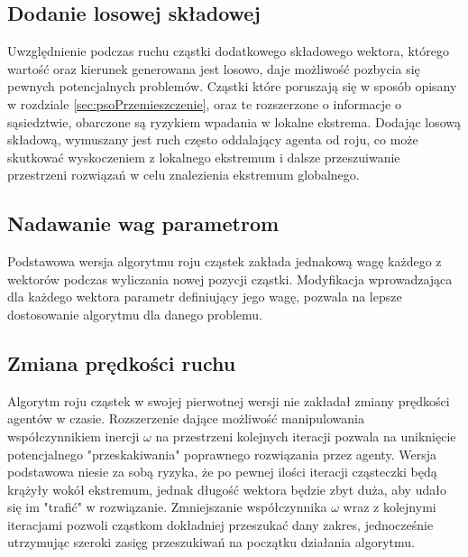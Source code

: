 \subsection{Dodanie losowej składowej}
\label{sec:psoLosowa}
Uwzględnienie podczas ruchu cząstki dodatkowego składowego wektora, którego wartość oraz kierunek generowana jest losowo, daje możliwość pozbycia się pewnych potencjalnych problemów. Cząstki które poruszają się w sposób opisany w rozdziale \ref{sec:psoPrzemieszczenie}, oraz te rozszerzone o informacje o sąsiedztwie, obarczone są ryzykiem wpadania w lokalne ekstrema. Dodając losową składową, wymuszany jest ruch często oddalający agenta od roju, co może skutkować wyskoczeniem z lokalnego ekstremum i dalsze przeszuiwanie przestrzeni rozwiązań w celu znalezienia ekstremum globalnego.


\subsection{Nadawanie wag parametrom}
\label{sec:psoWagi}
Podstawowa wersja algorytmu roju cząstek zakłada jednakową wagę każdego z wektorów podczas wyliczania nowej pozycji cząstki. Modyfikacja wprowadzająca dla każdego wektora parametr definiujący jego wagę, pozwala na lepsze dostosowanie algorytmu dla danego problemu.


\subsection{Zmiana prędkości ruchu}
\label{sec:psoPredkosc}
Algorytm roju cząstek w swojej pierwotnej wersji nie zakładał zmiany prędkości agentów w czasie. Rozszerzenie dające możliwość manipulowania współczynnikiem inercji $\omega$ na przestrzeni kolejnych iteracji pozwala na uniknięcie potencjalnego "przeskakiwania" poprawnego rozwiązania przez agenty. Wersja podstawowa niesie za sobą ryzyka, że po pewnej ilości iteracji cząsteczki będą krążyły wokół ekstremum, jednak długość wektora będzie zbyt duża, aby udało się im "trafić" w rozwiązanie. Zmniejszanie współczynnika $\omega$ wraz z kolejnymi iteracjami pozwoli cząstkom dokładniej przeszukać dany zakres, jednocześnie utrzymując szeroki zasięg przeszukiwań na początku działania algorytmu.

